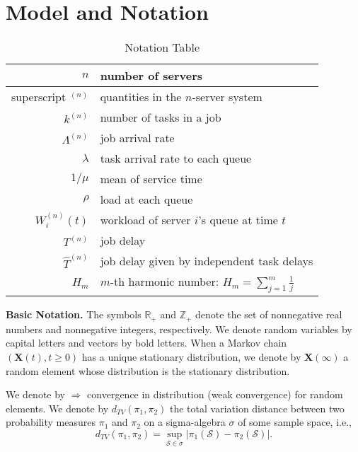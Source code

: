 \documentclass[sigconf]{acmart}
\newcommand{\supn}{^{(n)}}
\newcommand{\tod}{\Rightarrow}
\begin{document}
\section{Model and Notation}\label{sec:model-notation}


\begin{table}[tb]
\centering
\begin{tabular}{rp{}}
\toprule
$n$ & number of servers\\
\midrule
superscript $^{(n)}$ & quantities in the $n$-server system \\
\midrule
$k\supn$ & number of tasks in a job\\
\midrule
$\Lambda\supn$ & job arrival rate\\
\midrule
$\lambda$ & task arrival rate to each queue\\
\midrule
$1/\mu$ & mean of service time\\
\midrule
$\rho$ & load at each queue\\
\midrule
$W\supn_i(t)$ & workload of server $i$'s queue at time $t$\\
\midrule
$T\supn$ & job delay\\
\midrule
$\hat{T}\supn$ & job delay given by independent task delays\\
\midrule
$H_m$ & $m$-th harmonic number: $H_m=\sum_{j=1}^m\frac{1}{j}$\\
\bottomrule
\end{tabular}
  \caption{Notation Table}
  \label{tb:notation}
\end{table}





\textbf{Basic Notation.}
The symbols $\mathbb{R}_+$ and $\mathbb{Z}_+$ denote the set of nonnegative real numbers and nonnegative integers, respectively. We denote random variables by capital letters and vectors by bold letters. When a Markov chain $(\bm{X}(t),t\ge 0)$ has a unique stationary distribution, we denote by $\bm{X}(\infty)$ a random element whose distribution is the stationary distribution.


We denote by $\tod$ convergence in distribution (weak convergence) for random elements. We denote by $d_{TV}(\pi_1,\pi_2)$ the total variation distance between two probability measures $\pi_1$ and $\pi_2$ on a sigma-algebra $\sigma$ of some sample space, i.e.,
\begin{equation}
d_{TV}(\pi_1,\pi_2)=\sup_{\mathcal{S}\in\sigma}|\pi_1(\mathcal{S})-\pi_2(\mathcal{S})|.
\end{equation}
\end{document}
